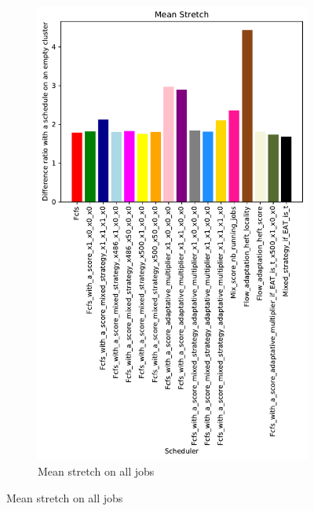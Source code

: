 \documentclass[a4paper]{article}
\begin{document}
\begin{figure}[H]
\begin{subfigure}[b]{0.4\linewidth}\centering\includegraphics[width=0.9\linewidth]{MBSS/plot/Results_FCFS_Score_Adaptative_Multiplier_2022-04-07->2022-04-09_V9271_Mean_Stretch_450_128_32_256_4_1024.pdf}\caption{Mean stretch on all jobs}\end{subfigure}

\end{figure}
\end{document}
